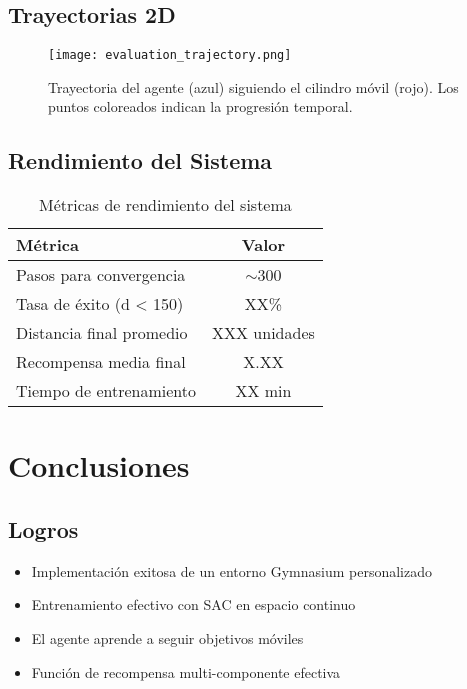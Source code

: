 \documentclass[12pt,a4paper]{article}
\begin{document}
\subsection{Trayectorias 2D}

\begin{figure}[H]
    \centering
    \texttt{[image: evaluation\_trajectory.png]}
    \caption{Trayectoria del agente (azul) siguiendo el cilindro móvil (rojo). Los puntos coloreados indican la progresión temporal.}
    \label{fig:trajectories}
\end{figure}

\subsection{Rendimiento del Sistema}

\begin{table}[H]
\centering
\begin{tabular}{@{}lc@{}}
\toprule
\textbf{Métrica} & \textbf{Valor} \\ \midrule
Pasos para convergencia & $\sim$300 \\
Tasa de éxito (d < 150) & XX\% \\
Distancia final promedio & XXX unidades \\
Recompensa media final & X.XX \\
Tiempo de entrenamiento & XX min \\ \bottomrule
\end{tabular}
\caption{Métricas de rendimiento del sistema}
\end{table}

\section{Conclusiones}

\subsection{Logros}
\begin{itemize}
    \item Implementación exitosa de un entorno Gymnasium personalizado
    \item Entrenamiento efectivo con SAC en espacio continuo
    \item El agente aprende a seguir objetivos móviles
    \item Función de recompensa multi-componente efectiva
\end{itemize}
\end{document}
